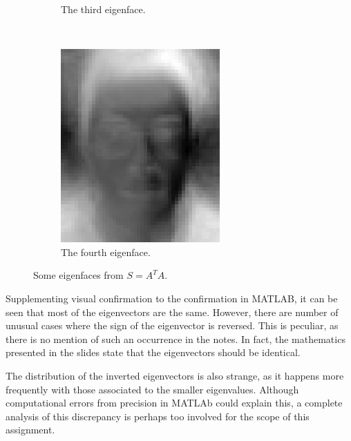 \documentclass[a4paper, 10pt, conference]{ieeeconf}
\begin{document}
\begin{figure}[!ht]
\begin{subfigure}{0.1\textwidth}
          \caption{The third eigenface.}
                \label{fig:eigface6}
        \end{subfigure}
        ~
        \begin{subfigure}{0.1\textwidth}
          \includegraphics[width=\textwidth]{src/eigface7.png}
                \caption{The fourth eigenface.}
                \label{fig:eigface7}
        \end{subfigure}
	\caption{Some eigenfaces from $S = A^T A$.}
\end{figure}

Supplementing visual confirmation to the confirmation in MATLAB, it can be seen that most of the eigenvectors are the same. However, there are number of unusual cases where the sign of the eigenvector is reversed. This is peculiar, as there is no mention of such an occurrence in the notes. In fact, the mathematics presented in the slides state that the eigenvectors should be identical.

The distribution of the inverted eigenvectors is also strange, as it happens more frequently with those associated to the smaller eigenvalues. Although computational errors from precision in MATLAb could explain this, a complete analysis of this discrepancy is perhaps too involved for the scope of this assignment.
\end{document}
